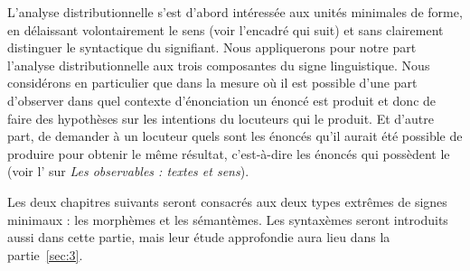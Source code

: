 L’analyse distributionnelle s’est d’abord intéressée aux unités minimales de forme, en délaissant volontairement le sens (voir l’encadré qui suit) et sans clairement distinguer le syntactique du signifiant. Nous appliquerons pour notre part l’analyse distributionnelle aux trois composantes du signe linguistique. Nous considérons en particulier que  dans la mesure où il est possible d’une part d’observer dans quel contexte d’énonciation un énoncé est produit et donc de faire des hypothèses sur les intentions du locuteurs qui le produit. Et d’autre part, de demander à un locuteur quels sont les énoncés qu’il aurait été possible de produire pour obtenir le même résultat, c’est-à-dire les énoncés qui possèdent le  (voir l’ sur \textit{Les observables : textes et sens}).

\begin{sloppypar}
Les deux chapitres suivants seront consacrés aux deux types extrêmes de signes minimaux : les morphèmes et les sémantèmes. Les syntaxèmes seront introduits aussi dans cette partie, mais leur étude approfondie aura lieu dans la partie~\ref{sec:3}.
\end{sloppypar}

